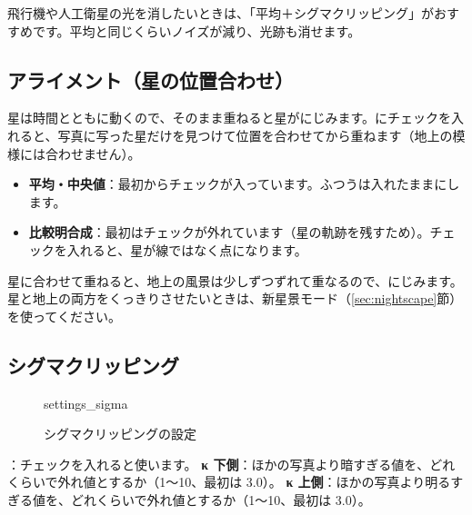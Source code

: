 \begin{hint}[中央値とシグマクリッピング]
飛行機や人工衛星の光を消したいときは、「平均＋シグマクリッピング」がおすすめです。平均と同じくらいノイズが減り、光跡も消せます。
\end{hint}

\subsection{アライメント（星の位置合わせ）}

星は時間とともに動くので、そのまま重ねると星がにじみます。にチェックを入れると、写真に写った星だけを見つけて位置を合わせてから重ねます（地上の模様には合わせません）。

\begin{itemize}[itemsep=0.3ex]
  \item \textbf{平均・中央値}：最初からチェックが入っています。ふつうは入れたままにします。
  \item \textbf{比較明合成}：最初はチェックが外れています（星の軌跡を残すため）。チェックを入れると、星が線ではなく点になります。
\end{itemize}

\begin{caution}[地上の風景がにじむ]
星に合わせて重ねると、地上の風景は少しずつずれて重なるので、にじみます。星と地上の両方をくっきりさせたいときは、新星景モード（\ref{sec:nightscape}節）を使ってください。
\end{caution}

\subsection{シグマクリッピング}\label{sec:sigma}

\begin{figure}[H]
\centering
\begin{screenshot}[0.46\linewidth]{settings_sigma}
\end{screenshot}
\caption{シグマクリッピングの設定}
\end{figure}

\begin{callouts}
 ：チェックを入れると使います。
 \textbf{κ 下側}：ほかの写真より暗すぎる値を、どれくらいで外れ値とするか（1〜10、最初は 3.0）。
 \textbf{κ 上側}：ほかの写真より明るすぎる値を、どれくらいで外れ値とするか（1〜10、最初は 3.0）。
\end{callouts}

